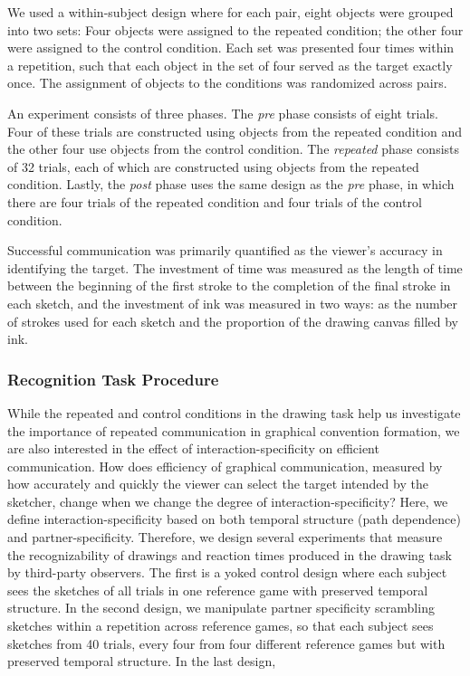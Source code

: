\documentclass[10pt,letterpaper]{article}
\begin{document}
We used a within-subject design where for each pair, eight objects were grouped into two sets: Four objects were assigned to the repeated condition; the other four were assigned to the control condition. Each set was presented four times within a repetition, such that each object in the set of four served as the target exactly once. The assignment of objects to the conditions was randomized across pairs.

An experiment consists of three phases. The \textit{pre} phase consists of eight trials. Four of these trials are constructed using objects from the repeated condition and the other four use objects from the control condition. The \textit{repeated} phase consists of 32 trials, each of which are constructed using objects from the repeated condition. Lastly, the \textit{post} phase uses the same design as the \textit{pre} phase, in which there are four trials of the repeated condition and four trials of the control condition.

Successful communication was primarily quantified as the viewer's accuracy in identifying the target. The investment of time was measured as the length of time between the beginning of the first stroke to the completion of the final stroke in each sketch, and the investment of ink was measured in two ways: as the number of strokes used for each sketch and the proportion of the drawing canvas filled by ink.


\subsubsection{Recognition Task Procedure}
While the repeated and control conditions in the drawing task help us investigate the importance of repeated communication in graphical convention formation, we are also interested in the effect of interaction-specificity on efficient communication. How does efficiency of graphical communication, measured by how accurately and quickly the viewer can select the target intended by the sketcher, change when we change the degree of interaction-specificity? Here, we define interaction-specificity based on both temporal structure (path dependence) and partner-specificity. Therefore, we design several experiments that measure the recognizability of drawings and reaction times produced in the drawing task by third-party observers. The first is a yoked control design where each subject sees the sketches of all trials in one reference game with preserved temporal structure. In the second design, we manipulate partner specificity scrambling sketches within a repetition across reference games, so that each subject sees sketches from 40 trials, every four from four different reference games but with preserved temporal structure. In the last design,
\end{document}
